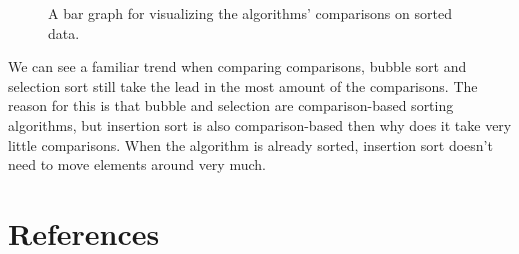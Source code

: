 \documentclass{article}
\begin{document}
\begin{figure}[H]
\caption{A bar graph for visualizing the algorithms’ comparisons on sorted data.}
\centering
\end{figure}

We can see a familiar trend when comparing comparisons, bubble sort and selection sort still take the lead in the most amount of the comparisons. The reason for this is that bubble and selection are comparison-based sorting algorithms, but insertion sort is also comparison-based then why does it take very little comparisons. When the algorithm is already sorted, insertion sort doesn't need to move elements around very much.

\section{References}
\end{document}
